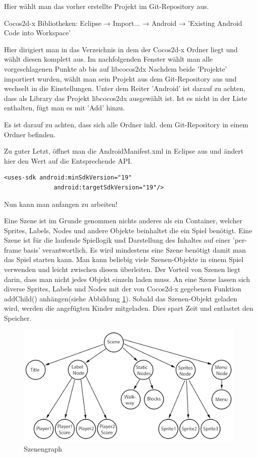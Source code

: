 Hier wählt man das vorher erstellte Projekt im Git-Repository aus.

	Cocos2d-x Bibliotheken: Eclipse → Import... → Android → 'Existing Android Code into 	Workspace'

Hier dirigiert man in das Verzeichnis in dem der Cocos2d-x Ordner liegt und wählt diesen komplett aus. Im nachfolgenden Fenster wählt man alle vorgeschlagenen Punkte ab bis auf libcocos2dx Nachdem beide 'Projekte' importiert wurden, wählt man sein Projekt aus dem Git-Repository aus und wechselt in die Einstellungen. Unter dem Reiter 'Android' ist darauf zu achten, dass als Library das Projekt libcocos2dx ausgewählt ist. Ist es nicht in der Liste enthalten, fügt man es mit 'Add' hinzu. 

Es ist darauf zu achten, dass sich alle Ordner inkl. dem Git-Repository in einem Ordner befinden.

Zu guter Letzt, öffnet man die AndroidManifest.xml in Eclipse aus und ändert hier den Wert auf die Entsprechende API.
\begin{lstlisting}[style=singleline]
	<uses-sdk android:minSdkVersion="19"
			  android:targetSdkVersion="19"/>
\end{lstlisting}
	

Nun kann man anfangen zu arbeiten! 



\label{sec:2_Szenenprinzip}
Eine Szene ist im Grunde genommen nichts anderes als ein Container, welcher  Sprites, Labels, Nodes und andere Objekte beinhaltet die ein Spiel benötigt. Eine Szene ist für die laufende Spiellogik und Darstellung des Inhaltes auf einer 'per-frame basis' verantwortlich. Es wird mindestens eine Szene benötigt damit man das Spiel starten kann. Man kann beliebig viele Szenen-Objekte in einem Spiel verwenden und leicht zwischen diesen überleiten. Der Vorteil von Szenen liegt darin, dass man nicht jedes Objekt einzeln laden muss. An eine Szene lassen sich diverse Sprites, Labels und Nodes mit der von Cocos2d-x gegebenen Funktion addChild() anhängen(siehe Abbildung \ref{fig:szenengraph}). Sobald das Szenen-Objekt geladen wird, werden die angefügten Kinder mitgeladen. Dies spart Zeit und entlastet den Speicher.

\begin{figure}[H]
  \centering
  \includegraphics[width=12cm]{resources/scenegraph}
  \caption{Szenengraph}
  \label{fig:szenengraph} 
\end{figure}


